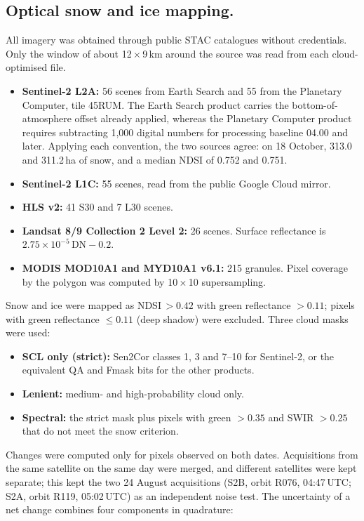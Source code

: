 \documentclass{nature}
\begin{document}
\begin{methods}
\subsection{Optical snow and ice mapping.}
All imagery was obtained through public STAC catalogues without credentials. Only the window of about 12\,$\times$\,9\,km around the source was read from each cloud-optimised file.
\begin{itemize}
\item \textbf{Sentinel-2 L2A\cite{drusch2012}:} 56 scenes from Earth Search and 55 from the Planetary Computer, tile 45RUM. The Earth Search product carries the bottom-of-atmosphere offset already applied, whereas the Planetary Computer product requires subtracting 1,000 digital numbers for processing baseline 04.00 and later. Applying each convention, the two sources agree: on 18 October, 313.0 and 311.2\,ha of snow, and a median NDSI of 0.752 and 0.751.
\item \textbf{Sentinel-2 L1C:} 55 scenes, read from the public Google Cloud mirror.
\item \textbf{HLS v2:} 41 S30 and 7 L30 scenes\cite{claverie2018}.
\item \textbf{Landsat 8/9 Collection 2 Level 2:} 26 scenes. Surface reflectance is $2.75\times10^{-5}\,\mathrm{DN}-0.2$.
\item \textbf{MODIS MOD10A1 and MYD10A1 v6.1:} 215 granules\cite{hall1995}. Pixel coverage by the polygon was computed by 10\,$\times$\,10 supersampling.
\end{itemize}
Snow and ice were mapped as NDSI\,$>0.42$ with green reflectance $>0.11$; pixels with green reflectance $\leq0.11$ (deep shadow) were excluded. Three cloud masks were used:
\begin{itemize}
\item \textbf{SCL only (strict):} Sen2Cor classes 1, 3 and 7--10 for Sentinel-2, or the equivalent QA and Fmask bits for the other products.
\item \textbf{Lenient:} medium- and high-probability cloud only.
\item \textbf{Spectral:} the strict mask plus pixels with green $>0.35$ and SWIR $>0.25$ that do not meet the snow criterion.
\end{itemize}
Changes were computed only for pixels observed on both dates. Acquisitions from the same satellite on the same day were merged, and different satellites were kept separate; this kept the two 24 August acquisitions (S2B, orbit R076, 04:47\,UTC; S2A, orbit R119, 05:02\,UTC) as an independent noise test. The uncertainty of a net change combines four components in quadrature:

\end{methods}
\end{document}
